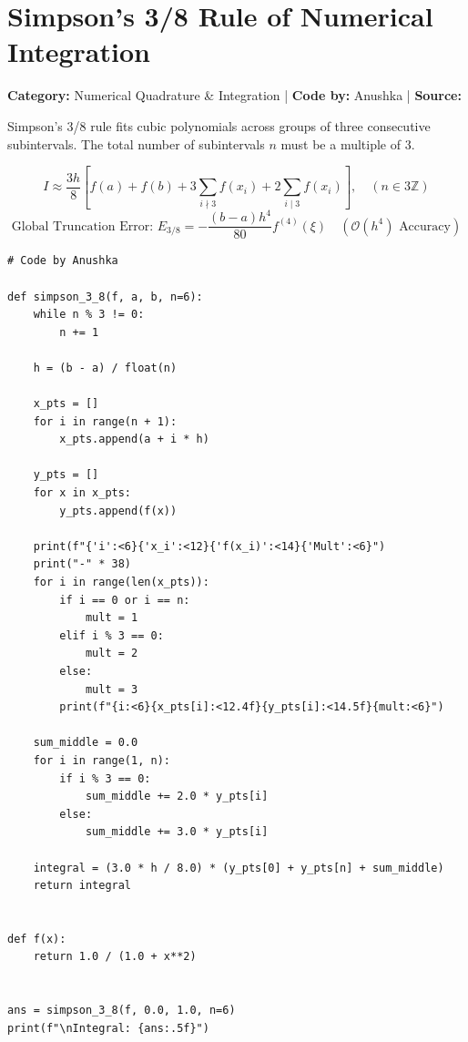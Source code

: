 \documentclass[10pt,a4paper]{report}
\begin{document}
\newpage

\section{Simpson's 3/8 Rule of Numerical Integration}
\textbf{Category:} \textcolor{secondary}{Numerical Quadrature \& Integration} \quad | \quad \textbf{Code by:} \textcolor{secondary}{Anushka} \quad | \quad \textbf{Source:} \texttt{}

Simpson's 3/8 rule fits cubic polynomials across groups of three consecutive subintervals. The total number of subintervals $n$ must be a multiple of 3.

\begin{tcolorbox}[colback=theorybg,colframe=theoryframe,title=\textbf{Mathematical Theory \& Formulation},boxrule=1pt,arc=2mm]
\[
I \approx \frac{3h}{8}\left[f(a) + f(b) + 3 \sum_{i \nmid 3} f(x_i) + 2 \sum_{i \mid 3} f(x_i)\right], \quad (n \in 3\mathbb{Z})
\]
\[
\text{Global Truncation Error: } E_{3/8} = -\frac{(b - a) h^4}{80} f^{(4)}(\xi) \quad (\mathcal{O}(h^4) \text{ Accuracy})
\]
\end{tcolorbox}

\begin{tcolorbox}[colback=codebg,colframe=secondary,title=\textbf{Python Implementation (Step-by-Step Loops \& Pure Functions)},boxrule=1pt,arc=2mm]
\begin{lstlisting}[style=python_detailed]
# Code by Anushka

def simpson_3_8(f, a, b, n=6):
    while n % 3 != 0:
        n += 1

    h = (b - a) / float(n)

    x_pts = []
    for i in range(n + 1):
        x_pts.append(a + i * h)

    y_pts = []
    for x in x_pts:
        y_pts.append(f(x))

    print(f"{'i':<6}{'x_i':<12}{'f(x_i)':<14}{'Mult':<6}")
    print("-" * 38)
    for i in range(len(x_pts)):
        if i == 0 or i == n:
            mult = 1
        elif i % 3 == 0:
            mult = 2
        else:
            mult = 3
        print(f"{i:<6}{x_pts[i]:<12.4f}{y_pts[i]:<14.5f}{mult:<6}")

    sum_middle = 0.0
    for i in range(1, n):
        if i % 3 == 0:
            sum_middle += 2.0 * y_pts[i]
        else:
            sum_middle += 3.0 * y_pts[i]

    integral = (3.0 * h / 8.0) * (y_pts[0] + y_pts[n] + sum_middle)
    return integral


def f(x):
    return 1.0 / (1.0 + x**2)


ans = simpson_3_8(f, 0.0, 1.0, n=6)
print(f"\nIntegral: {ans:.5f}")

\end{lstlisting}
\end{tcolorbox}
\end{document}
